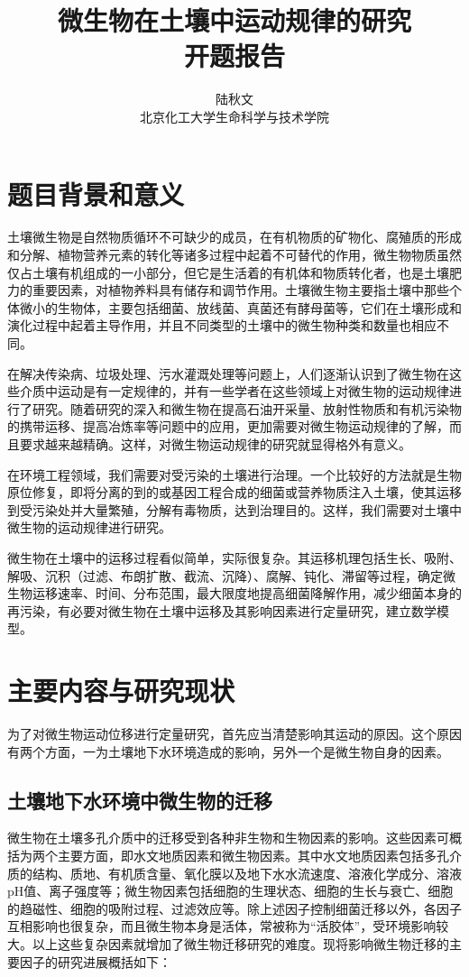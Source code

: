 \documentclass[a4paper,cs4size,adobefonts,fancyhdr]{ctexart}[2005/11/25]
\title{\heiti\zihao{-3} 微生物在土壤中运动规律的研究\\开题报告}
\author{\kaishu 陆秋文 \\ \kaishu 北京化工大学生命科学与技术学院}
\date{}
\newcommand{\upcite}[1]{\textsuperscript{\textsuperscript{\cite{#1}}}}
\numberwithin{equation}{section} %
\begin{document}
\setlength{\baselineskip}{22pt}

\section{题目背景和意义}
土壤微生物是自然物质循环不可缺少的成员，在有机物质的矿物化、腐殖质的形成和分解、植物营养元素的转化等诸多过程中起着不可替代的作用，微生物物质虽然仅占土壤有机组成的一小部分，但它是生活着的有机体和物质转化者，也是土壤肥力的重要因素，对植物养料具有储存和调节作用。土壤微生物主要指土壤中那些个体微小的生物体，主要包括细菌、放线菌、真菌还有酵母菌等，它们在土壤形成和演化过程中起着主导作用，并且不同类型的土壤中的微生物种类和数量也相应不同。\par
在解决传染病、垃圾处理、污水灌溉处理等问题上，人们逐渐认识到了微生物在这些介质中运动是有一定规律的，并有一些学者在这些领域上对微生物的运动规律进行了研究。随着研究的深入和微生物在提高石油开采量、放射性物质和有机污染物的携带运移、提高冶炼率等问题中的应用，更加需要对微生物运动规律的了解，而且要求越来越精确。这样，对微生物运动规律的研究就显得格外有意义。\par
在环境工程领域，我们需要对受污染的土壤进行治理。一个比较好的方法就是生物原位修复，即将分离的到的或基因工程合成的细菌或营养物质注入土壤，使其运移到受污染处并大量繁殖，分解有毒物质，达到治理目的。这样，我们需要对土壤中微生物的运动规律进行研究。\par
微生物在土壤中的运移过程看似简单，实际很复杂。其运移机理包括生长、吸附、解吸、沉积（过滤、布朗扩散、截流、沉降）、腐解、钝化、滞留等过程，确定微生物运移速率、时间、分布范围，最大限度地提高细菌降解作用，减少细菌本身的再污染，有必要对微生物在土壤中运移及其影响因素进行定量研究，建立数学模型\upcite{高琼2011}。
\section{主要内容与研究现状}
为了对微生物运动位移进行定量研究，首先应当清楚影响其运动的原因。这个原因有两个方面，一为土壤地下水环境造成的影响，另外一个是微生物自身的因素。
\subsection{土壤地下水环境中微生物的迁移}
微生物在土壤多孔介质中的迁移受到各种非生物和生物因素的影响。这些因素可概括为两个主要方面，即水文地质因素和微生物因素。其中水文地质因素包括多孔介质的结构、质地、有机质含量、氧化膜以及地下水水流速度、溶液化学成分、溶液pH值、离子强度等；微生物因素包括细胞的生理状态、细胞的生长与衰亡、细胞的趋磁性、细胞的吸附过程、过滤效应等。除上述因子控制细菌迁移以外，各因子互相影响也很复杂，而且微生物本身是活体，常被称为“活胶体”，受环境影响较大。以上这些复杂因素就增加了微生物迁移研究的难度。现将影响微生物迁移的主要因子的研究进展概括如下\upcite{张瑞玲2007}：
\end{document}
